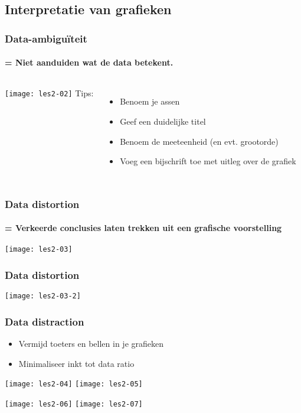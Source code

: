 \documentclass[aspectratio=169]{beamer}
\begin{document}
\subsection{Interpretatie van grafieken}

\begin{frame}
  \frametitle{Data-ambiguïteit}
  \framesubtitle{= Niet aanduiden wat de data betekent.}
  
  \begin{columns}
    \texttt{[image: les2-02]}
    Tips:
    \begin{itemize}
      \item Benoem je assen
      \item Geef een duidelijke titel
      \item Benoem de meeteenheid (en evt. grootorde)
      \item Voeg een bijschrift toe met uitleg over de grafiek
    \end{itemize}
  \end{columns}
\end{frame}

\begin{frame}
  \frametitle{Data distortion}
  \framesubtitle{= Verkeerde conclusies laten trekken uit een grafische voorstelling}
  
  \bigskip
  
  \begin{center}
    \texttt{[image: les2-03]}
  \end{center}
\end{frame}

\begin{frame}
  \frametitle{Data distortion}
  
  \begin{center}
    \texttt{[image: les2-03-2]}
  \end{center}
\end{frame}

\begin{frame}
  \frametitle{Data distraction}
  
  \begin{itemize}
    \item Vermijd toeters en bellen in je grafieken
    \item Minimaliseer inkt tot data ratio
  \end{itemize}
  
  \centering
  \texttt{[image: les2-04]}
  \texttt{[image: les2-05]}
  
  \texttt{[image: les2-06]}
  \texttt{[image: les2-07]}
\end{frame}
\end{document}
